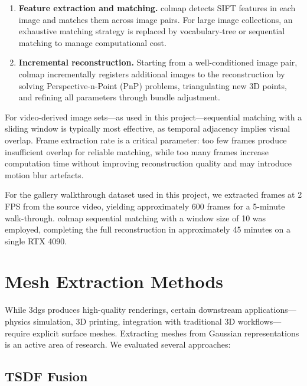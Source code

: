\begin{enumerate}
  \item \textbf{Feature extraction and matching.} \acrshort{colmap} detects SIFT features \parencite{Lowe2004} in each image and matches them across image pairs. For large image collections, an exhaustive matching strategy is replaced by vocabulary-tree or sequential matching to manage computational cost.

  \item \textbf{Incremental reconstruction.} Starting from a well-conditioned image pair, \acrshort{colmap} incrementally registers additional images to the reconstruction by solving Perspective-n-Point (PnP) problems, triangulating new 3D points, and refining all parameters through bundle adjustment.
\end{enumerate}

For video-derived image sets---as used in this project---sequential matching with a sliding window is typically most effective, as temporal adjacency implies visual overlap. Frame extraction rate is a critical parameter: too few frames produce insufficient overlap for reliable matching, while too many frames increase computation time without improving reconstruction quality and may introduce motion blur artefacts.

\begin{technote}
For the gallery walkthrough dataset used in this project, we extracted frames at 2 FPS from the source video, yielding approximately 600 frames for a 5-minute walk-through. \acrshort{colmap} sequential matching with a window size of 10 was employed, completing the full reconstruction in approximately 45 minutes on a single RTX 4090.
\end{technote}

\section{Mesh Extraction Methods}
\label{sec:tech-mesh}

While \acrshort{3dgs} produces high-quality renderings, certain downstream applications---physics simulation, 3D printing, integration with traditional 3D workflows---require explicit surface meshes. Extracting meshes from Gaussian representations is an active area of research. We evaluated several approaches:

\subsection{TSDF Fusion}
\label{sec:tech-tsdf}

